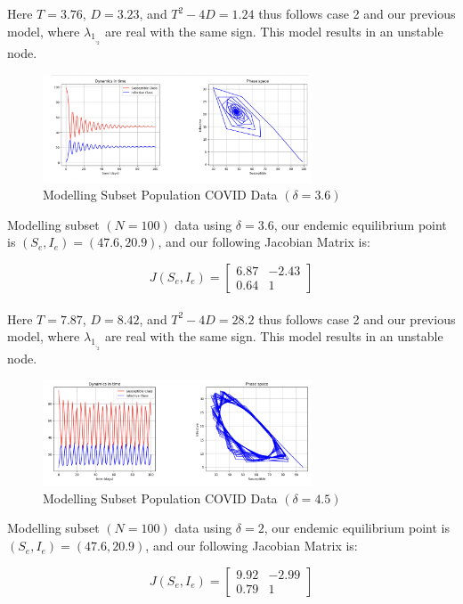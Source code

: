 \documentclass[%
 reprint,
]{revtex4-2}
\begin{document}
Here $T=3.76$, $D=3.23$, and $T^2-4D=1.24$ thus follows case 2 and our previous model, where $\lambda_1_,_2$ are real with the same sign. This model results in an unstable node. \\

\begin{figure}[h]
\caption{Modelling Subset Population COVID Data $(\delta = 3.6)$}
\centering
\includegraphics[width=80mm,scale=0.5]{n=100,a=.84,b=.4,d=3.6.png}
\end{figure}

Modelling subset $(N=100)$ data using $\delta = 3.6$, our endemic equilibrium point is $(S_e, I_e)= (47.6,20.9)$, and our following Jacobian Matrix is: 

\begin{equation}
J(S_e,I_e) = \begin{bmatrix} 
6.87 & -2.43 \\
0.64 & 1 \end{bmatrix}
\end{equation} \\

Here $T=7.87$, $D=8.42$, and $T^2-4D=28.2$ thus follows case 2 and our previous model, where $\lambda_1_,_2$ are real with the same sign. This model results in an unstable node. \\

\begin{figure}[h]
\caption{Modelling Subset Population COVID Data $(\delta = 4.5)$}
\centering
\includegraphics[width=80mm,scale=0.5]{n=100,a=.84,b=.4,d=4.5.png}
\end{figure}

Modelling subset $(N=100)$ data using $\delta = 2$, our endemic equilibrium point is $(S_e, I_e)= (47.6,20.9)$, and our following Jacobian Matrix is: 

\begin{equation}
J(S_e,I_e) = \begin{bmatrix} 
9.92 & -2.99 \\
0.79 & 1 \end{bmatrix}
\end{equation} \\
\end{document}

